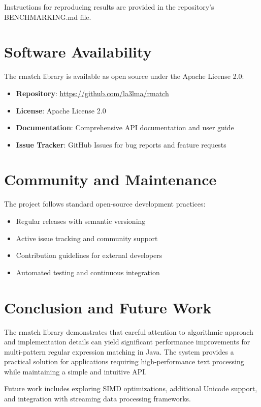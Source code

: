 \documentclass{article}
\begin{document}
Instructions for reproducing results are provided in the repository's BENCHMARKING.md file.

\section{Software Availability}

The rmatch library is available as open source under the Apache License 2.0:

\begin{itemize}
\item \textbf{Repository}: \url{https://github.com/la3lma/rmatch}
\item \textbf{License}: Apache License 2.0
\item \textbf{Documentation}: Comprehensive API documentation and user guide
\item \textbf{Issue Tracker}: GitHub Issues for bug reports and feature requests
\end{itemize}

\section{Community and Maintenance}

The project follows standard open-source development practices:

\begin{itemize}
\item Regular releases with semantic versioning
\item Active issue tracking and community support
\item Contribution guidelines for external developers
\item Automated testing and continuous integration
\end{itemize}

\section{Conclusion and Future Work}

The rmatch library demonstrates that careful attention to algorithmic approach and implementation details can yield significant performance improvements for multi-pattern regular expression matching in Java. The system provides a practical solution for applications requiring high-performance text processing while maintaining a simple and intuitive API.

Future work includes exploring SIMD optimizations, additional Unicode support, and integration with streaming data processing frameworks. 



\end{document}
